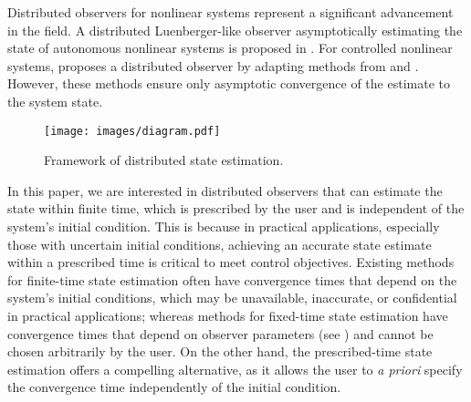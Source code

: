 \documentclass[journal]{IEEEtran}
\begin{document}
Distributed observers for nonlinear systems represent a significant advancement in the field. A distributed Luenberger-like observer asymptotically estimating the state of autonomous nonlinear systems is proposed in \cite{Battilotti2019}. For controlled nonlinear systems, \cite{Yuanqing22} proposes a distributed observer by adapting methods from \cite{Kim2016} and \cite{Trentelman19}. 
However, these methods ensure only asymptotic convergence of the estimate to the system state.


 \begin{figure}[t]
      \centering
      \texttt{[image: images/diagram.pdf]} 
      \caption{Framework of distributed state estimation.}
      \label{fig:disobsnetwork}
  \end{figure}


In this paper, we are interested in distributed observers that can estimate the state within finite time, which is prescribed by the user and is independent of the system's initial condition. This is because in practical applications, especially those with uncertain initial conditions, achieving an accurate state estimate within a prescribed time is critical to meet control objectives. Existing methods for finite-time state estimation often have convergence times that depend on the system's initial conditions, which may be unavailable, inaccurate, or confidential in practical applications; whereas methods for fixed-time state estimation have convergence times that depend on observer parameters (see \cite{Ge2023}) and cannot be chosen arbitrarily by the user. On the other hand, the prescribed-time state estimation offers a compelling alternative, as it allows the user to \textit{a priori} specify the convergence time independently of the initial condition. 



\end{document}
